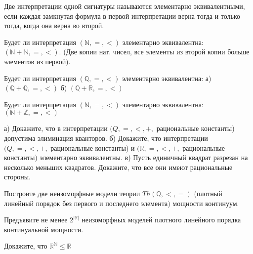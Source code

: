\setcounter{curtask}{21}



Две интерпретации одной сигнатуры называются элементарно
эквивалентными, если каждая замкнутая формула в первой интерпретации
верна тогда и только тогда, когда она верна во второй.

\begin{task}
    Будет ли интерпретация $(\mathbb{N}, =, <)$ элементарно
    эквивалентна: $(\mathbb{N} + \mathbb{N}, =, <)$. (Две копии нат. чисел, все
    элементы из второй копии больше элементов из первой).
\end{task}

\begin{task}
    Будет ли интерпретация $(\mathbb{Q}, =, <)$ элементарно
    эквивалентна:
    а) $(\mathbb{Q} + \mathbb{Q}, =, <)$
    б) $(\mathbb{Q} + \mathbb{R}, =, <)$
\end{task}

\begin{task}
    Будет ли интерпретация $(\mathbb{N}, =, <)$ элементарно
    эквивалентна: $(\mathbb{N} + \mathbb{Z}, =, <)$
\end{task}

\begin{task}
    а) Докажите, что в интерпретации $(Q, =, <, +,$ рациональные
    константы) допустима элиминация кванторов.
    б) Докажите, что интерпретации $(Q, =, <, +,$ рациональные
    константы) и $(\mathbb{R}, =, <, +,$ рациональные константы)
    элементарно эквивалентны.
    в) Пусть единичный квадрат разрезан на несколько меньших
    квадратов. Докажите, что все они имеют рациональные стороны.
\end{task}

\begin{task}
    Построите две неизоморфные модели теории $Th(\mathbb{Q}, <, =)$
    (плотный линейный порядок без первого и последнего элемента)
    мощности континуум.
\end{task}

\begin{task}
    Предъявите не менее $2^{|\mathbb{R}|}$ неизоморфных моделей плотного линейного
    порядка континуальной мощности.
\end{task}

\breakline

\begin{ptask}{8}
    Докажите, что $\mathbb{R}^{\mathbb{N}} \le \mathbb{R}$
\end{ptask}

